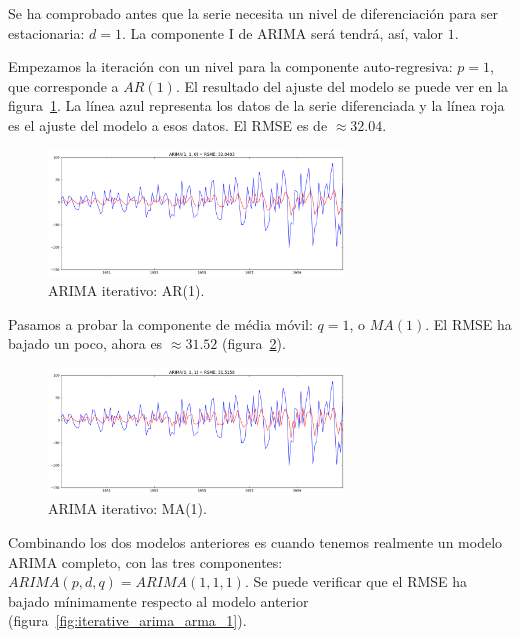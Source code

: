 \documentclass[11pt,spanish,listoffigures,listoftables]{tfgetsinf}
\begin{document}
    Se ha comprobado antes que la serie necesita un nivel de diferenciación para ser estacionaria: \(d=1\). La componente I de ARIMA será tendrá, así, valor \(1\). 
    
    Empezamos la iteración con un nivel para la componente auto-regresiva: \(p=1\), que corresponde a \(AR(1)\). El resultado del ajuste del modelo se puede ver en la figura~\ref{fig:iterative_arima_ar_1}. La línea azul representa los datos de la serie diferenciada y la línea roja es el ajuste del modelo a esos datos. El RMSE es de \(\approx32.04\). 
    
    \begin{figure}[h]
        \centering
        \includegraphics[width=0.7\textwidth]{arima_110.png}
        \caption{ARIMA iterativo: AR(1).}
        \label{fig:iterative_arima_ar_1}
    \end{figure}
    
    Pasamos a probar la componente de média móvil: \(q=1\), o \(MA(1)\). El RMSE ha bajado un poco, ahora es \(\approx31.52\) (figura~\ref{fig:iterative_arima_ma_1}).
    
    \begin{figure}[h]
        \centering
        \includegraphics[width=0.7\textwidth]{arima_011.png}
        \caption{ARIMA iterativo: MA(1).}
        \label{fig:iterative_arima_ma_1}
    \end{figure}
    
    Combinando los dos modelos anteriores es cuando tenemos realmente un modelo ARIMA completo, con las tres componentes: \(ARIMA(p, d, q)=ARIMA(1, 1, 1)\). Se puede verificar que el RMSE ha bajado mínimamente respecto al modelo anterior (figura~\ref{fig:iterative_arima_arma_1}).
    
\end{document}
